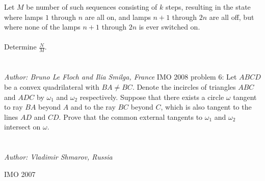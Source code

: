 Let $ M$ be number of such sequences consisting of $ k$ steps, resulting in the state where lamps $ 1$ through $ n$ are all on, and lamps $ n + 1$ through $ 2n$ are all off, but where none of the lamps $ n + 1$ through $ 2n$ is ever switched on. \\\\
Determine $ \frac {N}{M}$. \\\\\\
\textit{Author: Bruno Le Floch and Ilia Smilga, France} 
IMO 2008 problem 6:  Let $ ABCD$ be a convex quadrilateral with $ BA\neq BC$. Denote the incircles of triangles $ ABC$ and $ ADC$ by $ \omega_1$ and $ \omega_2$ respectively. Suppose that there exists a circle $ \omega$ tangent to ray $ BA$ beyond $ A$ and to the ray $ BC$ beyond $ C$, which is also tangent to the lines $ AD$ and $ CD$. Prove that the common external tangents to $ \omega_1$ and $\omega_2$ intersect on $ \omega$. \\\\\\
\textit{Author: Vladimir Shmarov, Russia} 

IMO 2007 

